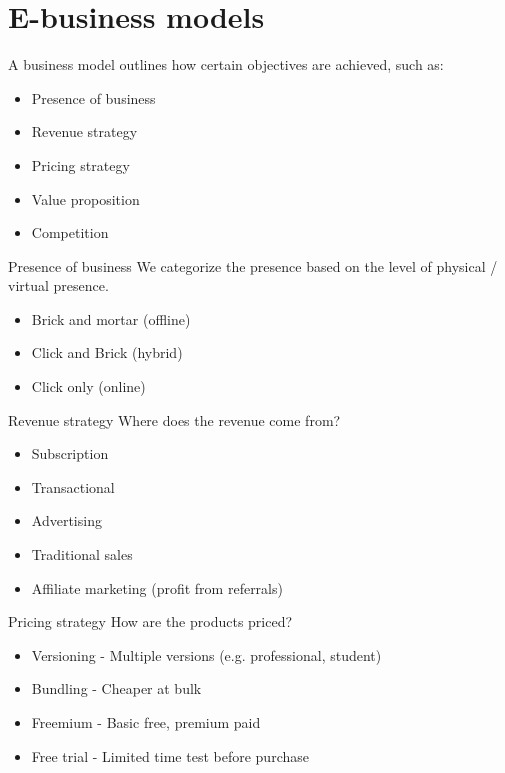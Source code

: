 \section{E-business models}

A business model outlines how certain objectives are achieved, such as:

\begin{itemize}
    \item Presence of business
    \item Revenue strategy
    \item Pricing strategy
    \item Value proposition
    \item Competition
\end{itemize}


\begin{knBox}
    {Presence of business}
    We categorize the presence based on the level of physical / virtual presence.

    \begin{itemize}
        \item Brick and mortar (offline)
        \item Click and Brick (hybrid)
        \item Click only (online)
    \end{itemize}
\end{knBox}

\begin{knBox}
    {Revenue strategy}
    Where does the revenue come from?

    \begin{itemize}
        \item Subscription
        \item Transactional
        \item Advertising
        \item Traditional sales
        \item Affiliate marketing (profit from referrals)
    \end{itemize}
\end{knBox}


\begin{knBox}
    {Pricing strategy}
    How are the products priced?

    \begin{itemize}
        \item Versioning - Multiple versions (e.g. professional, student)
        \item Bundling - Cheaper at bulk
        \item Freemium - Basic free, premium paid
        \item Free trial - Limited time test before purchase
    \end{itemize}
\end{knBox}

